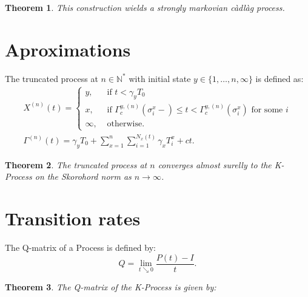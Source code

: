 \documentclass[a1,portrait]{a0poster}
\newtheorem{teorema}{Theorem}
\newcommand{\Nz}{{\mathbb{N^*}}}
\begin{document}
\begin{textblock}{15}
  \begin{teorema}
    This construction wields a strongly markovian càdlàg process.
  \end{teorema}


  \section{Aproximations}

  The truncated process at $n \in \Nz$ with initial state $y \in \{1,
  \ldots, n, \infty\}$ is defined as:
  \begin{gather*}
    X^{(n)}(t) = \begin{cases}
      y, & \textrm{ if }  t < \gamma_y T_0 \\
      x, & \textrm{ if } \Gamma^{y,(n)}_c(\sigma_i^x-) \leq t <
      \Gamma^{y,(n)}_c(\sigma^x_i)
      \textrm{ for some } i \\
      \infty, & \textrm{ otherwise.}
    \end{cases}\\
    \Gamma^{(n)} (t) = \gamma_y T_0
    + \sum_{x =1}^{n} \sum_{i = 1}^{N_x(t)}
    \gamma_x T_i^x
    + ct.
  \end{gather*}

  \begin{teorema}
    The truncated process at $n$ converges almost surelly to the
    K-Process on the Skorohord norm as $n \to \infty$.
  \end{teorema}

  \section{Transition rates}

  The Q-matrix of a Process is defined by:
  \begin{displaymath}
    Q = \lim_{t \searrow 0} \frac{P(t) - I}{t}.
  \end{displaymath}

  \begin{teorema}
    The Q-matrix of the K-Process is given by:


\end{teorema}
\end{textblock}
\end{document}
